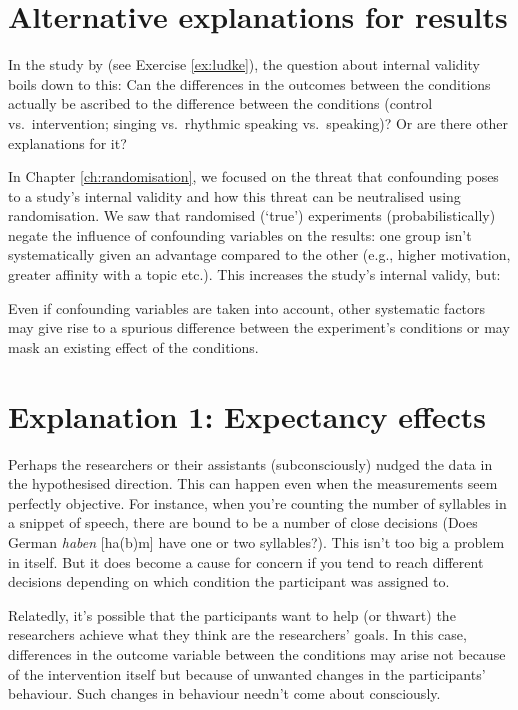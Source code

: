\documentclass[a4paper]{tufte-book}\usepackage[]{graphicx}\usepackage[]{xcolor}
\begin{document}
\section{Alternative explanations for results}
In the study by \citet{Ludke2014} (see Exercise \ref{ex:ludke}), 
the question about internal validity boils down to this:
Can the differences in the outcomes between the conditions actually 
be ascribed to the difference between the conditions 
(control vs.\ intervention; singing vs.\ rhythmic speaking vs.\ speaking)?
Or are there other explanations for it?

In Chapter \ref{ch:randomisation}, we focused on
the threat that confounding poses to a study's internal validity
and how this threat can be neutralised using randomisation.
We saw that randomised (`true') experiments (probabilistically)
negate the influence of confounding variables on the results:
one group isn't systematically given
an advantage compared to the other (e.g., higher motivation,
greater affinity with a topic etc.). This increases
the study's internal validy, but:

\begin{framed}
Even if confounding variables are
taken into account, other systematic factors may
give rise to a spurious difference between
the experiment's conditions or may mask an
existing effect of the conditions.
\end{framed}

\section{Explanation 1: Expectancy effects}

Perhaps the researchers or their assistants (subconsciously)
nudged the data in the hypothesised direction. 
This can happen even when the measurements seem perfectly objective. 
For instance, when you're counting the number of syllables in a snippet of speech, 
there are bound to be a number of close decisions
(Does German \textit{haben} [ha(b)m] have one or two syllables?).
This isn't too big a problem in itself.
But it does become a cause for concern 
if you tend to reach different decisions 
depending on which condition the participant was assigned to.

Relatedly, it's possible that the participants want to help (or thwart)
the researchers achieve what they think are the researchers' goals.
In this case, differences in the outcome variable between the conditions may arise
not because of the intervention itself but because of unwanted changes
in the participants' behaviour. Such changes in behaviour needn't come about
consciously.
\end{document}
